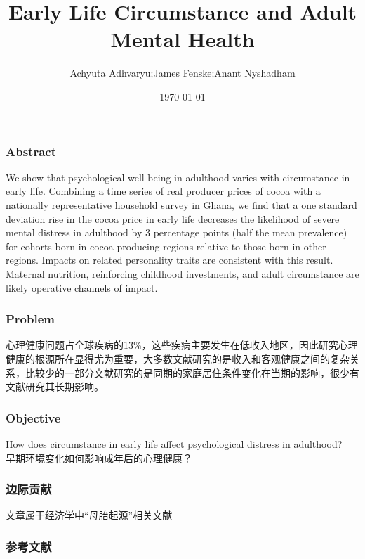 \documentclass{beamer}
\title[文献分享:ZY]{Early Life Circumstance and Adult Mental Health}
\author[Achyuta et al.]{Achyuta Adhvaryu;James Fenske;Anant Nyshadham}
\date{\today}
\begin{document}
\frame{\titlepage}



\begin{frame}
\frametitle{Abstract}
We show that psychological well-being in adulthood varies with circumstance in early life. Combining a time series of real producer prices of cocoa with a nationally representative household survey in Ghana, we ﬁnd that a one standard deviation rise in the cocoa price in early life decreases the likelihood of severe mental distress in adulthood by 3 percentage points (half the mean prevalence) for cohorts born in cocoa-producing regions relative to those born in other regions. Impacts on related personality traits are consistent with this result. Maternal nutrition, reinforcing childhood investments, and adult circumstance are likely operative channels of impact.
\citep{Almond2019}\citet{Adhvaryu2019}
\end{frame}



\begin{frame}
    \frametitle{Problem}
心理健康问题占全球疾病的13\%，这些疾病主要发生在低收入地区，因此研究心理健康的根源所在显得尤为重要，大多数文献研究的是收入和客观健康之间的复杂关系，比较少的一部分文献研究的是同期的家庭居住条件变化在当期的影响，很少有文献研究其长期影响。
\end{frame}

\begin{frame}
    \frametitle{Objective}
How does circumstance in early life aﬀect psychological distress in adulthood?
\\ 早期环境变化如何影响成年后的心理健康？
\end{frame}


\begin{frame}
    \frametitle{边际贡献}
    文章属于经济学中“母胎起源”相关文献
\end{frame}


\begin{frame}
    \frametitle{}
\end{frame}


\begin{frame}
    \frametitle{}
\end{frame}


\begin{frame}
    \frametitle{}
\end{frame}





\begin{frame}
    \frametitle{参考文献}


\end{frame}

\end{document}
